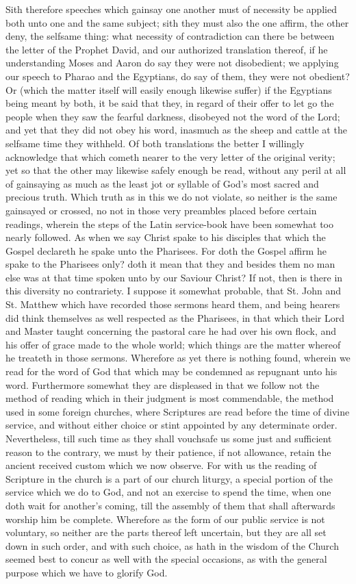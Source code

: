 Sith therefore speeches which gainsay one another must of necessity be applied both unto one and the same subject; sith they must also the one affirm, the other deny, the selfsame thing: what necessity of contradiction can there be between the letter of the Prophet David, and our authorized translation thereof, if he understanding Moses and Aaron do say they were not disobedient; we applying our speech to Pharao and the Egyptians, do say of them, they were not obedient? Or (which the matter itself will easily enough likewise suffer) if the Egyptians being meant by both, it be said that they, in regard of their offer to let go the people when they saw the fearful darkness, disobeyed not the word of the Lord; and yet that they did not obey his word, inasmuch as the sheep and cattle at the selfsame time they withheld. Of both translations the better I willingly acknowledge that which cometh nearer to the very letter of the original verity; yet so that the other may likewise safely enough be read, without any peril at all of gainsaying as much as the least jot or syllable of God’s most sacred and precious truth.
Which truth as in this we do not violate, so neither is the same gainsayed or crossed, no not in those very preambles placed before certain readings, wherein the steps of the Latin service-book have been somewhat too nearly followed. As when we say Christ spake to his disciples that which the Gospel declareth he spake unto the Pharisees. For doth the Gospel affirm he spake to the Pharisees only? doth it mean that they and besides them no man else was at that time spoken unto by our Saviour Christ? If not, then is there in this diversity no contrariety. I suppose it somewhat probable, that St. John and St. Matthew which have recorded those sermons heard them, and being hearers did think themselves as well respected as the Pharisees, in that which their  Lord and Master taught concerning the pastoral care he had over his own flock, and his offer of grace made to the whole world; which things are the matter whereof he treateth in those sermons. Wherefore as yet there is nothing found, wherein we read for the word of God that which may be condemned as repugnant unto his word.
Furthermore somewhat they are displeased in that we follow not the method of reading which in their judgment is most commendable, the method used in some foreign churches, where Scriptures are read before the time of divine service, and without either choice or stint appointed by any determinate order. Nevertheless, till such time as they shall vouchsafe us some just and sufficient reason to the contrary, we must by their patience, if not allowance, retain the ancient received custom which we now observe. For with us the reading of Scripture in the church is a part of our church liturgy, a special portion of the service which we do to God, and not an exercise to spend the time, when one doth wait for another’s coming, till the assembly of them that shall afterwards worship him be complete. Wherefore as the form of our public service is not voluntary, so neither are the parts thereof left uncertain, but they are all set down in such order, and with such choice, as hath in the wisdom of the Church seemed best to concur as well with the special occasions, as with the general purpose which we have to glorify God.

